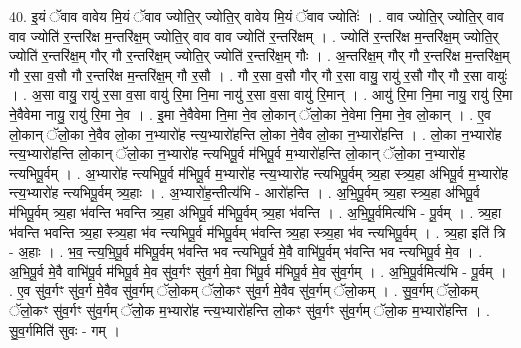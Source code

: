 \documentclass[17pt]{extarticle}
\begin{document}
40. इ॒यं ॅवाव वावेय मि॒यं ॅवाव ज्योति॒र् ज्योति॒र् वावेय मि॒यं ॅवाव ज्योतिः॑ । . वाव ज्योति॒र् ज्योति॒र् वाव वाव ज्योति॑ र॒न्तरि॑क्ष म॒न्तरि॑क्ष॒म् ज्योति॒र् वाव वाव ज्योति॑ र॒न्तरि॑क्षम् । . ज्योति॑ र॒न्तरि॑क्ष म॒न्तरि॑क्ष॒म् ज्योति॒र् ज्योति॑ र॒न्तरि॑क्ष॒म् गौर् गौ र॒न्तरि॑क्ष॒म् ज्योति॒र् ज्योति॑ र॒न्तरि॑क्ष॒म् गौः । . अ॒न्तरि॑क्ष॒म् गौर् गौ र॒न्तरि॑क्ष म॒न्तरि॑क्ष॒म् गौ र॒सा व॒सौ गौ र॒न्तरि॑क्ष म॒न्तरि॑क्ष॒म् गौ र॒सौ । . गौ र॒सा व॒सौ गौर् गौ र॒सा वायु॒ रायु॑ र॒सौ गौर् गौ र॒सा वायुः॑ । . अ॒सा वायु॒ रायु॑ र॒सा व॒सा वायु॑ रि॒मा नि॒मा नायु॑ र॒सा व॒सा वायु॑ रि॒मान् । . आयु॑ रि॒मा नि॒मा नायु॒ रायु॑ रि॒मा ने॒वैवेमा नायु॒ रायु॑ रि॒मा ने॒व । . इ॒मा ने॒वैवेमा नि॒मा ने॒व लो॒कान् ॅलो॒का ने॒वेमा नि॒मा ने॒व लो॒कान् । . ए॒व लो॒कान् ॅलो॒का ने॒वैव लो॒का न॒भ्यारो॑ह न्त्य॒भ्यारो॑हन्ति लो॒का ने॒वैव लो॒का न॒भ्यारो॑हन्ति । . लो॒का न॒भ्यारो॑ह न्त्य॒भ्यारो॑हन्ति लो॒कान् ॅलो॒का न॒भ्यारो॑ह न्त्यभिपू॒र्व म॑भिपू॒र्व म॒भ्यारो॑हन्ति लो॒कान् ॅलो॒का न॒भ्यारो॑ह न्त्यभिपू॒र्वम् । . अ॒भ्यारो॑ह न्त्यभिपू॒र्व म॑भिपू॒र्व म॒भ्यारो॑ह न्त्य॒भ्यारो॑ह न्त्यभिपू॒र्वम् त्र्य॒हा स्त्र्य॒हा अ॑भिपू॒र्व म॒भ्यारो॑ह न्त्य॒भ्यारो॑ह न्त्यभिपू॒र्वम् त्र्य॒हाः । . अ॒भ्यारो॑ह॒न्तीत्य॑भि - आरो॑हन्ति । . अ॒भि॒पू॒र्वम् त्र्य॒हा स्त्र्य॒हा अ॑भिपू॒र्व म॑भिपू॒र्वम् त्र्य॒हा भ॑वन्ति भवन्ति त्र्य॒हा अ॑भिपू॒र्व म॑भिपू॒र्वम् त्र्य॒हा भ॑वन्ति । . अ॒भि॒पू॒र्वमित्य॑भि - पू॒र्वम् । . त्र्य॒हा भ॑वन्ति भवन्ति त्र्य॒हा स्त्र्य॒हा भ॑व न्त्यभिपू॒र्व म॑भिपू॒र्वम् भ॑वन्ति त्र्य॒हा स्त्र्य॒हा भ॑व न्त्यभिपू॒र्वम् । . त्र्य॒हा इति॑ त्रि - अ॒हाः । . भ॒व॒ न्त्य॒भि॒पू॒र्व म॑भिपू॒र्वम् भ॑वन्ति भव न्त्यभिपू॒र्व मे॒वै वाभि॑पू॒र्वम् भ॑वन्ति भव न्त्यभिपू॒र्व मे॒व । . अ॒भि॒पू॒र्व मे॒वै वाभि॑पू॒र्व म॑भिपू॒र्व मे॒व सु॑व॒र्गꣳ सु॑व॒र्ग मे॒वा भि॑पू॒र्व म॑भिपू॒र्व मे॒व सु॑व॒र्गम् । . अ॒भि॒पू॒र्वमित्य॑भि - पू॒र्वम् । . ए॒व सु॑व॒र्गꣳ सु॑व॒र्ग मे॒वैव सु॑व॒र्गम् ॅलो॒कम् ॅलो॒कꣳ सु॑व॒र्ग मे॒वैव सु॑व॒र्गम् ॅलो॒कम् । . सु॒व॒र्गम् ॅलो॒कम् ॅलो॒कꣳ सु॑व॒र्गꣳ सु॑व॒र्गम् ॅलो॒क म॒भ्यारो॑ह न्त्य॒भ्यारो॑हन्ति लो॒कꣳ सु॑व॒र्गꣳ सु॑व॒र्गम् ॅलो॒क म॒भ्यारो॑हन्ति । . सु॒व॒र्गमिति॑ सुवः - गम् । \newline
\pagebreak
{}
\end{document}
